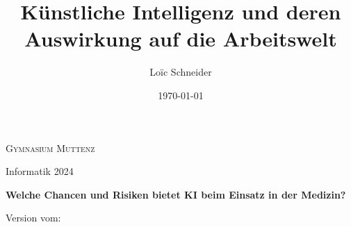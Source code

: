 \documentclass{report}
\title{Künstliche Intelligenz und deren Auswirkung auf die Arbeitswelt}
\author{Loïc Schneider}
\date{\today}
\begin{document}
\begin{titlepage}
    \makeatletter
    \begin{center}
        {\scshape Gymnasium Muttenz} \vspace{0.5cm}

        Informatik 2024\vspace{3.5cm}

        {\huge\bfseries \@title}

        \vspace{2cm}

        {\Large\bfseries Welche Chancen und Risiken bietet KI beim Einsatz in der Medizin?}

        \vspace{3cm}

        {\Large\itshape \@author}

        \vspace{0.5cm}

        Version vom: \@date

    \end{center}
    \makeatother

\end{titlepage}

\tableofcontents












\nocite{*}

\printbibliography
\end{document}
